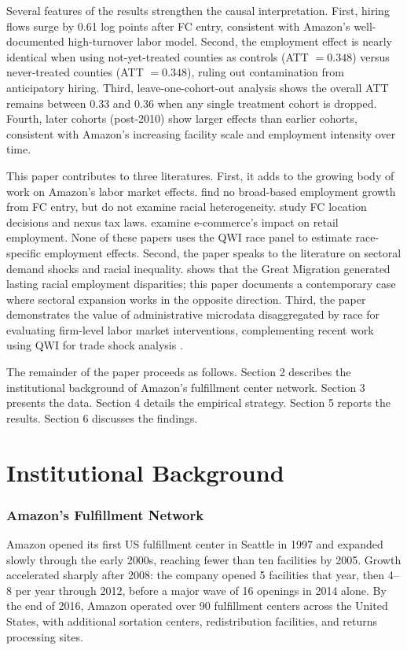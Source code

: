 \documentclass[12pt]{article}
\begin{document}
Several features of the results strengthen the causal interpretation. First, hiring flows surge by 0.61 log points after FC entry, consistent with Amazon's well-documented high-turnover labor model. Second, the employment effect is nearly identical when using not-yet-treated counties as controls (ATT $= 0.348$) versus never-treated counties (ATT $= 0.348$), ruling out contamination from anticipatory hiring. Third, leave-one-cohort-out analysis shows the overall ATT remains between 0.33 and 0.36 when any single treatment cohort is dropped. Fourth, later cohorts (post-2010) show larger effects than earlier cohorts, consistent with Amazon's increasing facility scale and employment intensity over time.

This paper contributes to three literatures. First, it adds to the growing body of work on Amazon's labor market effects. \citet{JonesZipperer2018} find no broad-based employment growth from FC entry, but do not examine racial heterogeneity. \citet{HoudeNewberrySeim2023} study FC location decisions and nexus tax laws. \citet{Autor2020} examine e-commerce's impact on retail employment. None of these papers uses the QWI race panel to estimate race-specific employment effects. Second, the paper speaks to the literature on sectoral demand shocks and racial inequality. \citet{Derenoncourt2022} shows that the Great Migration generated lasting racial employment disparities; this paper documents a contemporary case where sectoral expansion works in the opposite direction. Third, the paper demonstrates the value of administrative microdata disaggregated by race for evaluating firm-level labor market interventions, complementing recent work using QWI for trade shock analysis \citep{AutorDornHanson2013, Dix-Carneiro2017}.

The remainder of the paper proceeds as follows. Section 2 describes the institutional background of Amazon's fulfillment center network. Section 3 presents the data. Section 4 details the empirical strategy. Section 5 reports the results. Section 6 discusses the findings.


\section{Institutional Background}

\subsubsection*{Amazon's Fulfillment Network} Amazon opened its first US fulfillment center in Seattle in 1997 and expanded slowly through the early 2000s, reaching fewer than ten facilities by 2005. Growth accelerated sharply after 2008: the company opened 5 facilities that year, then 4--8 per year through 2012, before a major wave of 16 openings in 2014 alone. By the end of 2016, Amazon operated over 90 fulfillment centers across the United States, with additional sortation centers, redistribution facilities, and returns processing sites.
\end{document}
